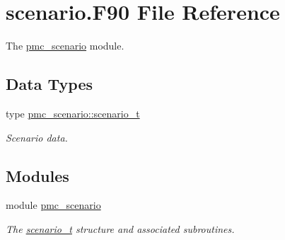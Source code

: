\hypertarget{scenario_8_f90}{}\section{scenario.\+F90 File Reference}
\label{scenario_8_f90}


The \mbox{\hyperlink{namespacepmc__scenario}{pmc\+\_\+scenario}} module.  


\subsection*{Data Types}
\begin{DoxyCompactItemize}
\item 
type \mbox{\hyperlink{structpmc__scenario_1_1scenario__t}{pmc\+\_\+scenario\+::scenario\+\_\+t}}
\begin{DoxyCompactList}\small\item\em Scenario data. \end{DoxyCompactList}\end{DoxyCompactItemize}
\subsection*{Modules}
\begin{DoxyCompactItemize}
\item 
module \mbox{\hyperlink{namespacepmc__scenario}{pmc\+\_\+scenario}}
\begin{DoxyCompactList}\small\item\em The \mbox{\hyperlink{structpmc__scenario_1_1scenario__t}{scenario\+\_\+t}} structure and associated subroutines. \end{DoxyCompactList}\end{DoxyCompactItemize}

